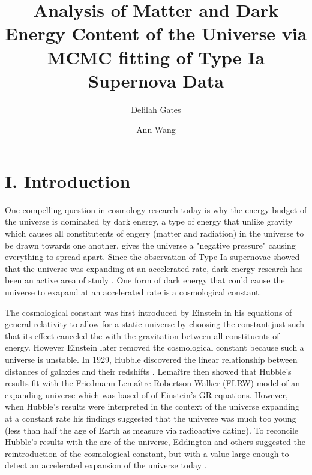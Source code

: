 \documentclass[aps,prl,reprint]{revtex4-1}
\begin{document}

\title{	Analysis of Matter and Dark Energy Content of the Universe via MCMC fitting of Type Ia Supernova Data}
\author{Delilah Gates}
\author{Ann Wang}
\begin{abstract}
\end{abstract}
\maketitle
\section{I. Introduction}
One compelling question in cosmology research today is why the energy budget of the universe is dominated by dark energy, a type of energy that unlike gravity which causes all constitutents of engery (matter and radiation) in the universe to be drawn towards one another, gives the universe a "negative pressure" causing everything to spread apart. Since the observation of Type Ia supernovae showed that the universe was expanding at an accelerated rate, dark energy research has been an active area of study \cite{riess_sn}. One form of dark energy that could cause the universe to exapand at an accelerated rate is a cosmological constant.

The cosmological constant was first introduced by Einstein in his equations of general relativity to allow for a static universe by choosing the constant just such that its effect canceled the with the gravitation between all constituents of energy. However Einstein later removed the cosmological constant because such a universe is unstable. In 1929, Hubble discovered the linear relationship between distances of galaxies and their redshifts \cite{Straumann:2002he}. Lemaître then showed that Hubble's results fit with the Friedmann-Lemaître-Robertson-Walker (FLRW) model of an expanding universe which was based of of Einstein's GR equations. However, when Hubble's results were interpreted in the context of the universe expanding at a constant rate his findings suggested that the universe was much too young (less than half the age of Earth as measure via radioactive dating). To reconcile Hubble's results with the are of the universe, Eddington and others suggested the reintroduction of the cosmological constant, but with a value large enough to detect an accelerated expansion of the universe today \cite{Straumann:2002he}. 
\end{document}
